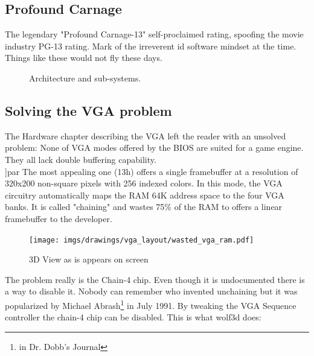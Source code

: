 \documentclass[book.tex]{subfiles}
\begin{document}
\subsection{Profound Carnage}
The legendary "Profound Carnage-13" self-proclaimed rating, spoofing the movie industry PG-13 rating. Mark of the irreverent id software mindset at the time. Things like these would not fly these days.
\begin{figure}[H]
\centering
{}
\caption{Architecture and sub-systems.}
\end{figure}





















\subsection{Solving the VGA problem}
The Hardware chapter describing the VGA left the reader with an unsolved problem: None of VGA modes offered by the BIOS are suited for a game engine. They all lack double buffering capability.\\
]par
 The most appealing one (13h) offers a single framebuffer at a resolution of 320x200 non-square pixels with 256 indexed colors. In this mode, the VGA circuitry automatically maps the RAM 64K address space to the four VGA banks. It is called "chaining" and wastes 75\% of the RAM to offers a linear framebuffer to the developer.\\
 \par
\begin{figure}[H]
\centering
 \texttt{[image: imgs/drawings/vga\_layout/wasted\_vga\_ram.pdf]}
 \caption{3D View as is appears on screen} \label{fig:vga_layout_in_3D}
 \end{figure}

 \par
 The problem really is the Chain-4 chip. Even though it is undocumented there is a way to disable it. Nobody can remember who invented unchaining but it was popularized by Michael Abrash\footnote{in Dr. Dobb's Journal} in July 1991. By tweaking the VGA Sequence controller the chain-4 chip can be disabled. This is what wolf3d does:\\
\end{document}
